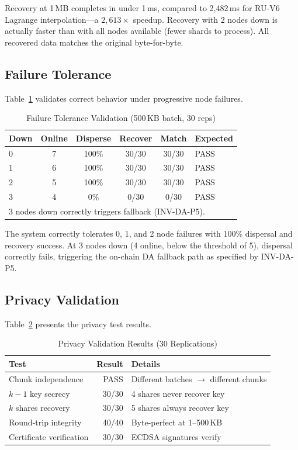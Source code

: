 Recovery at 1\,MB completes in under 1\,ms, compared to 2{,}482\,ms for
RU-V6 Lagrange interpolation---a $2{,}613\times$ speedup. Recovery with
2 nodes down is actually faster than with all nodes available (fewer
shards to process). All recovered data matches the original byte-for-byte.

\subsection{Failure Tolerance}

Table~\ref{tab:failure} validates correct behavior under progressive node
failures.

\begin{table}[t]
\centering
\caption{Failure Tolerance Validation (500\,KB batch, 30 reps)}
\label{tab:failure}
\begin{tabular}{@{}lccccl@{}}
\toprule
\textbf{Down} & \textbf{Online} & \textbf{Disperse} & \textbf{Recover} & \textbf{Match} & \textbf{Expected} \\
\midrule
0 & 7 & 100\% & 30/30 & 30/30 & PASS \\
1 & 6 & 100\% & 30/30 & 30/30 & PASS \\
2 & 5 & 100\% & 30/30 & 30/30 & PASS \\
3 & 4 & 0\%   & 0/30  & 0/30  & PASS \\
\bottomrule
\multicolumn{6}{l}{\footnotesize 3 nodes down correctly triggers fallback (INV-DA-P5).} \\
\end{tabular}
\end{table}

The system correctly tolerates 0, 1, and 2 node failures with 100\%
dispersal and recovery success. At 3 nodes down (4 online, below the
threshold of 5), dispersal correctly fails, triggering the on-chain DA
fallback path as specified by INV-DA-P5.

\subsection{Privacy Validation}

Table~\ref{tab:privacy} presents the privacy test results.

\begin{table}[t]
\centering
\caption{Privacy Validation Results (30 Replications)}
\label{tab:privacy}
\begin{tabular}{@{}lrl@{}}
\toprule
\textbf{Test} & \textbf{Result} & \textbf{Details} \\
\midrule
Chunk independence     & PASS   & Different batches $\rightarrow$ different chunks \\
$k{-}1$ key secrecy   & 30/30  & 4 shares never recover key \\
$k$ shares recovery   & 30/30  & 5 shares always recover key \\
Round-trip integrity   & 40/40  & Byte-perfect at 1--500\,KB \\
Certificate verification & 30/30 & ECDSA signatures verify \\
\bottomrule
\end{tabular}
\end{table}

